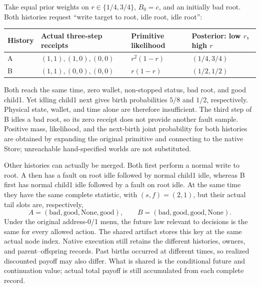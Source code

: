 \documentclass[
  english,
  11pt,
  oneside]{book}
\newcounter{none} %
\begin{document}
Take equal prior weights on \(r\in\{1/4,3/4\}\), \(B_0=c\), and an initially bad root. Both histories request ``write target to root, idle root, idle root'':

{\def\LTcaptype{none} %
\begin{longtable}[]{@{}
  >{\raggedright\arraybackslash}p{}
  >{\raggedright\arraybackslash}p{}
  >{\raggedright\arraybackslash}p{}
  >{\raggedright\arraybackslash}p{}@{}}
\toprule\noalign{}
\begin{minipage}[b]{\linewidth}\raggedright
History
\end{minipage} & \begin{minipage}[b]{\linewidth}\raggedright
Actual three-step receipts
\end{minipage} & \begin{minipage}[b]{\linewidth}\raggedright
Primitive likelihood
\end{minipage} & \begin{minipage}[b]{\linewidth}\raggedright
Posterior: low \(r\), high \(r\)
\end{minipage} \\
\midrule\noalign{}
\endhead
\bottomrule\noalign{}
\endlastfoot
A & \((1,1),(1,0),(0,0)\) & \(r^2(1-r)\) & \((1/4,3/4)\) \\
B & \((1,1),(0,0),(0,0)\) & \(r(1-r)\) & \((1/2,1/2)\) \\
\end{longtable}
}

Both reach the same time, zero wallet, non-stopped status, bad root, and good child1. Yet idling child1 next gives birth probabilities \(5/8\) and \(1/2\), respectively. Physical state, wallet, and time alone are therefore insufficient. The third step of B idles a bad root, so its zero receipt does not provide another fault sample. Positive mass, likelihood, and the next-birth joint probability for both histories are obtained by expanding the original primitive and connecting to the native Store; unreachable hand-specified worlds are not substituted.

Other histories can actually be merged. Both first perform a normal write to root. A then has a fault on root idle followed by normal child1 idle, whereas B first has normal child1 idle followed by a fault on root idle. At the same time they have the same complete statistic, with \((s,f)=(2,1)\), but their actual tail slots are, respectively, \[A=(\mathrm{bad},\mathrm{good},\mathrm{None},\mathrm{good}),\qquad
B=(\mathrm{bad},\mathrm{good},\mathrm{good},\mathrm{None}).\] Under the original address-0/1 menu, the future law relevant to decisions is the same for every allowed action. The shared artifact stores this key at the same actual node index. Native execution still retains the different histories, owners, and parent--offspring records. Past births occurred at different times, so realized discounted payoff may also differ. What is shared is the conditional future and continuation value; actual total payoff is still accumulated from each complete record.
\end{document}

